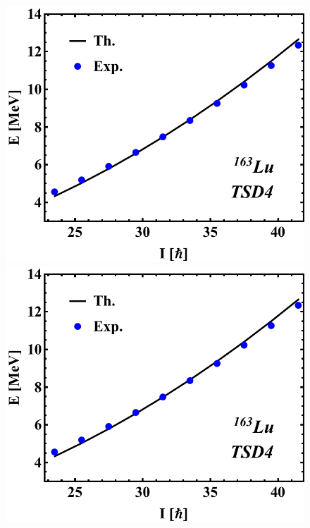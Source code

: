\documentclass{beamer}
\begin{document}
\begin{frame}
\begin{figure}
\begin{minipage}{.5\textwidth}
     \includegraphics[scale=0.3]{figs/DoubleShift_TSD4.pdf}
     \includegraphics[scale=0.3]{figs/DoubleShift_TSD4.pdf}
    \end{minipage}
    \end{figure}
\end{frame}
\end{document}
